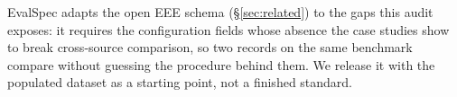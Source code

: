 \documentclass[11pt]{article}
\begin{document}
%
%
%

EvalSpec adapts the open EEE schema (\S\ref{sec:related}) to the gaps this audit
exposes: it requires the configuration fields whose absence the case studies show
to break cross-source comparison, so two records on the same benchmark compare
without guessing the procedure behind them. We release it with the
populated dataset as a starting point, not a finished standard.
\end{document}

